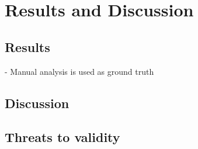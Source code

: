 \chapter{Results and Discussion}

\section{Results}
- Manual analysis is used as ground truth

\section{Discussion}

\section{Threats to validity}

